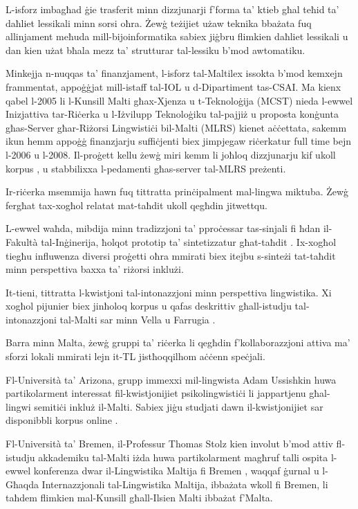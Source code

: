 \documentclass[]{../../metanetpaper}
\begin{document}
\begin{multicols}{2}
L-isforz imbagħad ġie trasferit minn dizzjunarji f’forma ta’ ktieb għal teħid ta’ daħliet lessikali minn sorsi oħra. Żewġ teżijiet \cite{Dalli:2001, Attard:2005} użaw teknika bbażata fuq allinjament meħuda mill-bijoinformatika sabiex jiġbru flimkien daħliet lessikali u dan kien użat bħala mezz ta’ strutturar tal-lessiku b’mod awtomatiku.

Minkejja n-nuqqas ta’ finanzjament, l-isforz tal-Maltilex issokta b’mod kemxejn frammentat, appoġġjat mill-istaff tal-IOL u d-Dipartiment tas-CSAI. Ma kienx qabel l-2005 li l-Kunsill Malti għax-Xjenza u t-Teknoloġija (MCST) nieda l-ewwel Inizjattiva tar-Riċerka u l-Iżvilupp Teknoloġiku tal-pajjiż u proposta konġunta għas-Server għar-Riżorsi Lingwistiċi bil-Malti (MLRS) kienet aċċettata, sakemm ikun hemm appoġġ finanzjarju suffiċjenti biex jimpjegaw riċerkatur full time bejn l-2006 u l-2008. Il-proġett kellu żewġ miri kemm li joħloq dizzjunarju kif ukoll korpus \cite{Rosner:2009}, u stabbilixxa l-pedamenti għas-server tal-MLRS preżenti.

Ir-riċerka msemmija hawn fuq tittratta prinċipalment mal-lingwa miktuba. Żewġ fergħat tax-xogħol relatat mat-taħdit ukoll qegħdin jitwettqu. 

L-ewwel waħda, mibdija minn tradizzjoni ta’ pproċessar tas-sinjali fi ħdan il-Fakultà tal-Inġinerija, ħolqot prototip ta’ sintetizzatur għat-taħdit \cite{Micallef:1997}. Ix-xogħol tiegħu influwenza diversi proġetti oħra mmirati biex itejbu s-sinteżi tat-taħdit minn perspettiva baxxa ta’ riżorsi inklużi\cite{Calleja:2002, Farrugia:2005, Camilleri:2010, Borg-et-al:2011}.

It-tieni, tittratta l-kwistjoni tal-intonazzjoni \cite{Vella:2009} minn perspettiva lingwistika. Xi xogħol pijunier biex jinħoloq korpus u qafas deskrittiv għall-istudju tal-intonazzjoni tal-Malti sar minn Vella u Farrugia \cite{Vella-Farrugia:2006}.

Barra minn Malta, żewġ gruppi ta’ riċerka li qegħdin f’kollaborazzjoni attiva ma’ sforzi lokali mmirati lejn it-TL  jistħoqqilhom aċċenn speċjali.

Fl-Università ta’ Arizona, grupp immexxi mil-lingwista Adam Ussishkin huwa partikolarment interessat fil-kwistjonijiet psikolingwistiċi li jappartjenu għal-lingwi semitiċi inkluż il-Malti. Sabiex jiġu studjati dawn il-kwistjonijiet sar disponibbli korpus online \cite{Ussishkin-et-al:2009}.

Fl-Università ta’ Bremen, il-Professur Thomas Stolz kien involut b’mod attiv fl-istudju akkademiku tal-Malti iżda huwa partikolarment magħruf talli ospita l-ewwel konferenza dwar il-Lingwistika Maltija fi Bremen \cite{Comrie-et-al:2009}, waqqaf ġurnal \cite{GHILM2} u l-Għaqda Internazzjonali tal-Lingwistika Maltija, ibbażata wkoll fi Bremen, li taħdem flimkien mal-Kunsill għall-Ilsien Malti ibbażat f’Malta.


\end{multicols}
\end{document}
